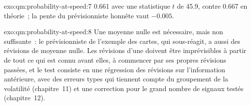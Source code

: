 \begin{solution}{exo:qm:probability-at-speed:7}
0.661 avec une statistique $t$ de 45.9, contre 0.667 en théorie~; la pente du prévisionniste honnête vaut
$-0.005$.
\end{solution}

\begin{solution}{exo:qm:probability-at-speed:8}
Une moyenne nulle est nécessaire, mais non suffisante~: le prévisionniste de l'exemple des cartes, qui sous-réagit, a aussi des
révisions de moyenne nulle. Les révisions d'une  doivent être imprévisibles à partir de tout ce qui est connu
avant elles, à commencer par ses propres révisions passées, et le test consiste en une régression des
révisions sur l'information antérieure, avec des erreurs types qui tiennent compte du groupement de
la volatilité (chapitre~11) et une correction pour le grand nombre de signaux testés (chapitre~12).
\end{solution}

